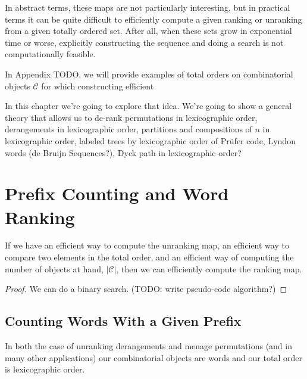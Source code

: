 In abstract terms, these maps are not particularly interesting, but in practical
terms it can be quite difficult to efficiently compute a given ranking or
unranking from a given totally ordered set. After all, when these sets
grow in exponential time or worse, explicitly constructing the sequence and
doing a search is not computationally feasible.

In Appendix TODO, we will provide examples of total orders on combinatorial
objects $\mathcal{C}$ for which constructing efficient


In this chapter we're going to explore that idea. We're going to show a general
theory that allows us to de-rank
permutations in lexicographic order,
derangements in lexicographic order,
partitions and compositions of $n$ in lexicographic order,
labeled trees by lexicographic order of Pr\"ufer code,
Lyndon words \cite{Kociumaka2014} (de Bruijn Sequences?),
Dyck path in lexicographic order?
\section{Prefix Counting and Word Ranking}


\begin{lemma}
  If we have
  an efficient way to compute the unranking map,
  an efficient way to compare two elements in the total order,
  and an efficient way of computing the number of objects at hand, $|\mathcal C|$,
  then we can efficiently compute the ranking map.
  \label{lemma:unrankToRank}
\end{lemma}
\begin{proof}
  We can do a binary search. (TODO: write pseudo-code algorithm?)
\end{proof}

\subsection{Counting Words With a Given Prefix}
In both the case of unranking derangements and menage permutations
(and in many other applications) our combinatorial objects are
words and our total order is lexicographic order.


